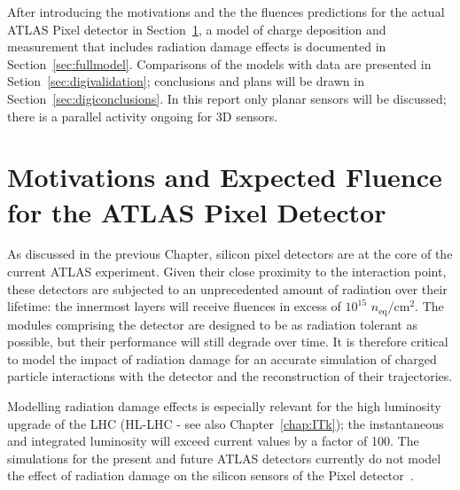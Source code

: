  
\noindent After introducing the motivations and the the fluences predictions for the actual ATLAS Pixel detector in 
Section~\ref{sec:expflu}, a model of charge deposition and measurement that includes radiation 
damage effects is documented in Section~\ref{sec:fullmodel}. Comparisons of the models with data are 
presented in Setion~\ref{sec:digivalidation}; conclusions and plans will be drawn in Section~\ref{sec:digiconclusions}.
In this report only planar sensors will be discussed; there is a parallel activity ongoing for 3D sensors.

\section{Motivations and Expected Fluence for the ATLAS Pixel Detector}
\label{sec:expflu}
As discussed in the previous Chapter, silicon pixel detectors are at 
the core of the current ATLAS  experiment.  Given their close proximity to the interaction point, these 
detectors are subjected to an 
unprecedented amount of radiation over their lifetime:  the innermost layers will receive 
fluences in excess of $10^{15}$  $n_\text{eq}/\text{cm}^2$. The modules comprising the detector are designed to be as radiation tolerant as possible, but their performance will still degrade over time.  It is therefore critical to model the impact of radiation damage for an accurate simulation of charged particle interactions with the detector and the reconstruction of their trajectories.  

\noindent Modelling radiation damage effects is especially relevant for the high luminosity upgrade of the LHC (HL-LHC - see also Chapter~\ref{chap:ITk}); the instantaneous and integrated luminosity will exceed current values by a factor of 100.  The simulations for the present and future ATLAS detectors currently do not model the effect of radiation damage on the silicon sensors of the Pixel detector~\cite{Aad:2010ah,ATL-PHYS-PUB-2016-025}.

